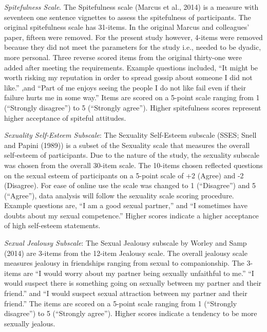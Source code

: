 \documentclass[
  english,
  a4paper]{apa7}
\begin{document}
\emph{Spitefulness Scale}.
The Spitefulness scale (Marcus et al., 2014) is a measure with seventeen one sentence vignettes to assess the spitefulness of participants. The original spitefulness scale has 31-items. In the original Marcus and colleagues' paper, fifteen were removed. For the present study however, 4-items were removed because they did not meet the parameters for the study i.e., needed to be dyadic, more personal. Three reverse scored items from the original thirty-one were added after meeting the requirements. Example questions included, ``It might be worth risking my reputation in order to spread gossip about someone I did not like.'' ,and ``Part of me enjoys seeing the people I do not like fail even if their failure hurts me in some way.'' Items are scored on a 5-point scale ranging from 1 (``Strongly disagree'') to 5 (``Strongly agree''). Higher spitefulness scores represent higher acceptance of spiteful attitudes.

\emph{Sexuality Self-Esteem Subscale}:
The Sexuality Self-Esteem subscale (SSES; Snell and Papini (1989)) is a subset of the Sexuality scale that measures the overall self-esteem of participants. Due to the nature of the study, the sexuality subscale was chosen from the overall 30-item scale. The 10-items chosen reflected questions on the sexual esteem of participants on a 5-point scale of +2 (Agree) and -2 (Disagree). For ease of online use the scale was changed to 1 (``Disagree'') and 5 (``Agree''), data analysis will follow the sexuality scale scoring procedure. Example questions are, ``I am a good sexual partner,'' and ``I sometimes have doubts about my sexual competence.'' Higher scores indicate a higher acceptance of high self-esteem statements.

\emph{Sexual Jealousy Subscale}:
The Sexual Jealousy subscale by Worley and Samp (2014) are 3-items from the 12-item Jealousy scale. The overall jealousy scale measures jealousy in friendships ranging from sexual to companionship. The 3-items are ``I would worry about my partner being sexually unfaithful to me.'' ``I would suspect there is something going on sexually between my partner and their friend.'' and ``I would suspect sexual attraction between my partner and their friend.'' The items are scored on a 5-point scale ranging from 1 (``Strongly disagree'') to 5 (``Strongly agree''). Higher scores indicate a tendency to be more sexually jealous.
\end{document}
